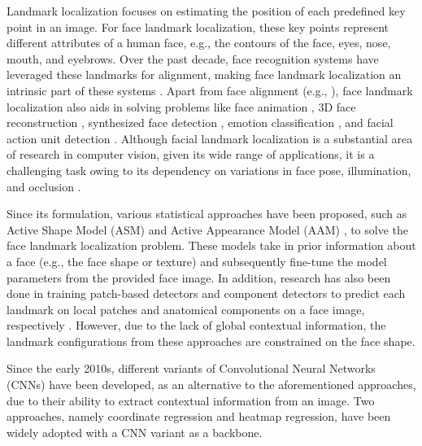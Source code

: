 \documentclass[journal]{IEEEtran}
\begin{document}
Landmark localization focuses on estimating the position of each predefined key point in an image.
For face landmark localization, these key points represent different attributes of a human face, e.g., the contours of the face, eyes, nose, mouth, and eyebrows.
Over the past decade, face recognition systems have leveraged these landmarks for alignment, making face landmark localization an intrinsic part of these systems
\cite{earp2021sub, kumar2009,wolf2009,parkhi2015,schroff2015,LiuWeiyang2017,wang2018,deng2018,an2020}.
Apart from face alignment (e.g., \cite{Barra2018, Kazemi2014}), face landmark localization also aids in solving problems like face animation \cite{cao2013}, 3D face reconstruction \cite{Roth2015,Dou2017,Feng2018}, synthesized face detection \cite{yang2019}, emotion classification \cite{day2016,munasinghe22018}, and facial action unit detection \cite{hinduja2020}.
Although facial landmark localization is a substantial area of research in computer vision, given its wide range of applications, it is a challenging task owing to its dependency on variations in face pose, illumination, and occlusion \cite{Dibeklioglu2008, earp2021sub}.

Since its formulation, various statistical approaches have been proposed, such as Active Shape Model (ASM) \cite{Cootes1995} and Active Appearance Model (AAM) \cite{Cootes1998}, to solve the face landmark localization problem.
These models take in prior information about a face (e.g., the face shape or texture) and subsequently fine-tune the model parameters from the provided face image.
In addition, research has also been done in training patch-based detectors and component detectors to predict each landmark on local patches and anatomical components on a face image, respectively \cite{Liang2008, Zhu2012, Amberg2011, Belhumeur2013, Efraty2011}. 
However, due to the lack of global contextual information, the landmark configurations from these approaches are constrained on the face shape.

Since the early 2010s, different variants of Convolutional Neural Networks (CNNs) have been developed, as an alternative to the aforementioned approaches, due to their ability to extract contextual information from an image.
Two approaches, namely coordinate regression and heatmap regression, have been widely adopted with a CNN variant as a backbone.
\end{document}
